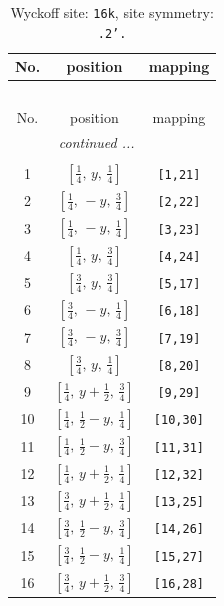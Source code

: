 \documentclass[fleqn,8pt]{jsarticle}
\begin{document}
\renewcommand{\arraystretch}{1.2}
\begin{longtable}{ccc}
\caption{Wyckoff site: {\tt 16k}, site symmetry: {\tt .2'.}}
 \\
 \hline \hline
No. & position & mapping \\ \hline \endfirsthead

\multicolumn{2}{l}{\tablename\ \thetable{}} \\
 \hline \hline
No. & position & mapping \\ \hline \endhead

 \hline \hline
\multicolumn{2}{r}{\footnotesize\it continued ...} \\ \endfoot

 \hline \hline
\multicolumn{2}{r}{} \\ \endlastfoot

1 & $\left[ \frac{1}{4},\, y,\, \frac{1}{4} \right]$ & {\tt [1,21]} \\ \hline
2 & $\left[ \frac{1}{4},\, - y,\, \frac{3}{4} \right]$ & {\tt [2,22]} \\ \hline
3 & $\left[ \frac{1}{4},\, - y,\, \frac{1}{4} \right]$ & {\tt [3,23]} \\ \hline
4 & $\left[ \frac{1}{4},\, y,\, \frac{3}{4} \right]$ & {\tt [4,24]} \\ \hline
5 & $\left[ \frac{3}{4},\, y,\, \frac{3}{4} \right]$ & {\tt [5,17]} \\ \hline
6 & $\left[ \frac{3}{4},\, - y,\, \frac{1}{4} \right]$ & {\tt [6,18]} \\ \hline
7 & $\left[ \frac{3}{4},\, - y,\, \frac{3}{4} \right]$ & {\tt [7,19]} \\ \hline
8 & $\left[ \frac{3}{4},\, y,\, \frac{1}{4} \right]$ & {\tt [8,20]} \\ \hline
9 & $\left[ \frac{1}{4},\, y + \frac{1}{2},\, \frac{3}{4} \right]$ & {\tt [9,29]} \\ \hline
10 & $\left[ \frac{1}{4},\, \frac{1}{2} - y,\, \frac{1}{4} \right]$ & {\tt [10,30]} \\ \hline
11 & $\left[ \frac{1}{4},\, \frac{1}{2} - y,\, \frac{3}{4} \right]$ & {\tt [11,31]} \\ \hline
12 & $\left[ \frac{1}{4},\, y + \frac{1}{2},\, \frac{1}{4} \right]$ & {\tt [12,32]} \\ \hline
13 & $\left[ \frac{3}{4},\, y + \frac{1}{2},\, \frac{1}{4} \right]$ & {\tt [13,25]} \\ \hline
14 & $\left[ \frac{3}{4},\, \frac{1}{2} - y,\, \frac{3}{4} \right]$ & {\tt [14,26]} \\ \hline
15 & $\left[ \frac{3}{4},\, \frac{1}{2} - y,\, \frac{1}{4} \right]$ & {\tt [15,27]} \\ \hline
16 & $\left[ \frac{3}{4},\, y + \frac{1}{2},\, \frac{3}{4} \right]$ & {\tt [16,28]} \\
\end{longtable}
\end{document}
